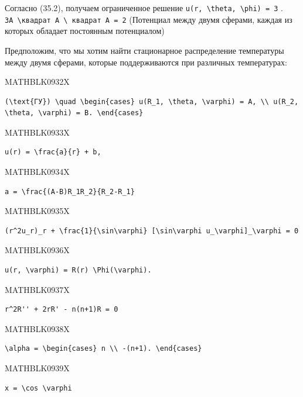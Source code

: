 \documentclass[
  ukrainian,
]{article}
\begin{document}
Согласно (35.2), получаем ограниченное решение
\texttt{u(r,\ \textbackslash{}theta,\ \textbackslash{}phi)\ =\ 3} .
\texttt{3A\ \textbackslash{}квадрат\ A\ \textbackslash{}\ квадрат\ A\ =\ 2}
(Потенциал между двумя сферами, каждая из которых обладает постоянным
потенциалом)

Предположим, что мы хотим найти стационарное распределение температуры
между двумя сферами, которые поддерживаются при различных температурах:

MATHBLK0932X

\begin{verbatim}
(\text{ГУ}) \quad \begin{cases} u(R_1, \theta, \varphi) = A, \\ u(R_2, \theta, \varphi) = B. \end{cases}
\end{verbatim}

MATHBLK0933X

\begin{verbatim}
u(r) = \frac{a}{r} + b,
\end{verbatim}

MATHBLK0934X

\begin{verbatim}
a = \frac{(A-B)R_1R_2}{R_2-R_1}
\end{verbatim}

MATHBLK0935X

\begin{verbatim}
(r^2u_r)_r + \frac{1}{\sin\varphi} [\sin\varphi u_\varphi]_\varphi = 0
\end{verbatim}

MATHBLK0936X

\begin{verbatim}
u(r, \varphi) = R(r) \Phi(\varphi).
\end{verbatim}

MATHBLK0937X

\begin{verbatim}
r^2R'' + 2rR' - n(n+1)R = 0
\end{verbatim}

MATHBLK0938X

\begin{verbatim}
\alpha = \begin{cases} n \\ -(n+1). \end{cases}
\end{verbatim}

MATHBLK0939X

\begin{verbatim}
x = \cos \varphi
\end{verbatim}
\end{document}
